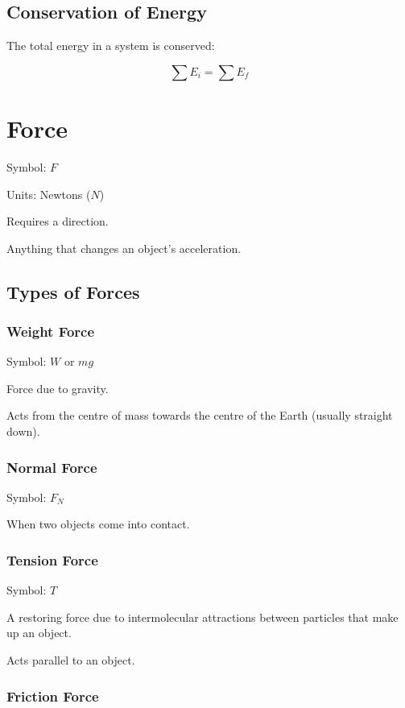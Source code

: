 \documentclass[a4paper,11pt]{article}
\begin{document}
\subsection{Conservation of Energy}

The total energy in a system is conserved:

$$
\sum E_i = \sum E_f
$$




\section{Force}

Symbol: $F$

Units: Newtons ($N$)

Requires a direction.

Anything that changes an object's acceleration.


\subsection{Types of Forces}

\subsubsection{Weight Force}

Symbol: $W$ or $mg$

Force due to gravity.

Acts from the centre of mass towards the centre of the Earth (usually straight
down).


\subsubsection{Normal Force}

Symbol: $F_N$

When two objects come into contact.


\subsubsection{Tension Force}

Symbol: $T$

A restoring force due to intermolecular attractions between particles that make
up an object.

Acts parallel to an object.


\subsubsection{Friction Force}
\end{document}
